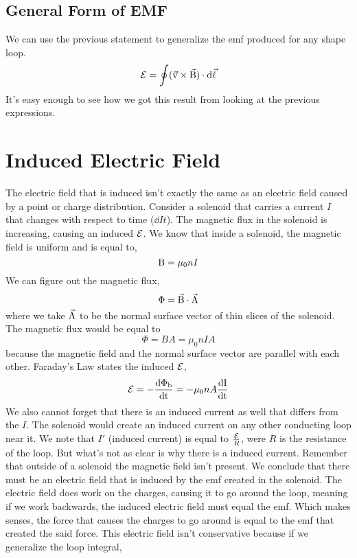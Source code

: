 \subsection{General Form of EMF}
We can use the previous statement to generalize the emf produced for any shape loop.
\begin{equation*}
	\mathcal{E} = \oint (\vec{\mathrm{v}} \times \vec{\mathrm{B}}) \cdot \mathrm{d}\vec{\mathrm{\ell}}	 
\end{equation*}
It's easy enough to see how we got this result from looking at the previous expressions.
\pagebreak
\section{Induced Electric Field}
The electric field that is induced isn't exactly the same as an electric field caused by a point or charge distribution. Consider a solenoid that carries a current $I$ that changes with respect to time ($\dd{I}{t}$). The magnetic flux in the solenoid is increasing, causing an induced $\mathcal{E}$. We know that inside a solenoid, the magnetic field is uniform and is equal to,
\begin{equation*}
	\mathrm{B}=\mu_0nI
\end{equation*}
We can figure out the magnetic flux, 
\begin{equation*}
	\Phi = \vec{\mathrm{B}} \cdot \vec{\mathrm{A}}
\end{equation*}
where we take $\vec{\mathrm{A}}$ to be the normal surface vector of thin slices of the solenoid. The magnetic flux would be equal to 
\begin{equation*}
	\Phi = BA = \mu_0nIA
\end{equation*}
because the magnetic field and the normal surface vector are parallel with each other. Faraday's Law states the induced $\mathcal{E}$,
\begin{equation*}
	\mathcal{E} = - \frac{\mathrm{d \Phi_b}}{\mathrm{d t}} = -\mu_0nA\frac{\mathrm{d I}}{\mathrm{d t}}
\end{equation*}
We also cannot forget that there is an induced current as well that differs from the $I$. The solenoid would create an induced current on any other conducting loop near it. We note that $I'$ (induced current) is equal to $\frac{\mathcal{E}}{R}$, were $R$ is the resistance of the loop. But what's not as clear is why there is a induced current. Remember that outside of a solenoid the magnetic field isn't present. We conclude that there must be an electric field that is induced by the emf created in the solenoid. The electric field does work on the charges, causing it to go around the loop, meaning if we work backwards, the induced electric field must equal the emf. Which makes senses, the force that causes the charges to go around is equal to the emf that created the said force. This electric field isn't conservative because if we generalize the loop integral, 
